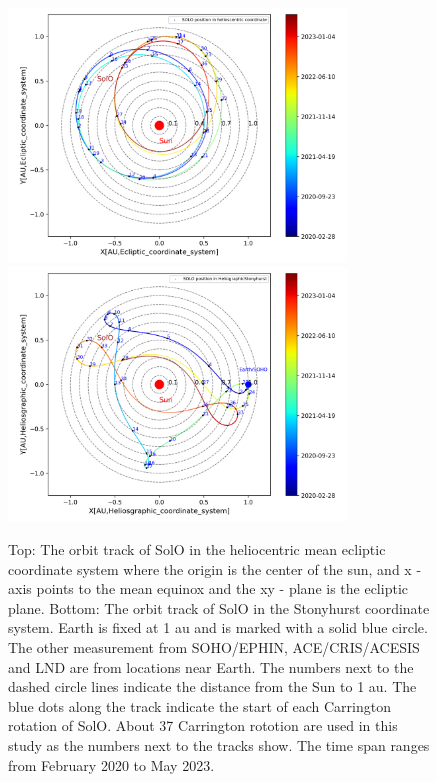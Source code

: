 \begin{figure}
    \centering
    \includegraphics[width=0.8\textwidth]{images/ACR/SOLO_orbit_track_helioscentric_3.png}
    \includegraphics[width = 0.8\textwidth]{images/ACR/SOLO_orbit_stonyhurst_3.png}
    \caption[Orbit track of \ac{SolO}]{Top: The orbit track of \ac{SolO} in the heliocentric mean ecliptic coordinate system where the origin is the center of the sun, and x - axis points to the mean equinox and the xy - plane is the ecliptic plane. Bottom: The orbit track of \ac{SolO} in the Stonyhurst coordinate system. Earth is fixed at 1 au and is marked with a solid blue circle. The other measurement from \acs{SOHO}/\acs{EPHIN}, \acs{ACE}/\acs{CRIS}/\acs{ACESIS} and \acs{LND} are from locations near Earth. The numbers next to the dashed circle lines indicate the distance from the Sun to 1 au.
    The blue dots along the track indicate the start of each Carrington rotation of \ac{SolO}. About 37 Carrington rototion are used in this study as the numbers next to the tracks show. The time span ranges from February 2020 to May 2023.}
    \label{fig:SOLO_orbit_track}
\end{figure}




